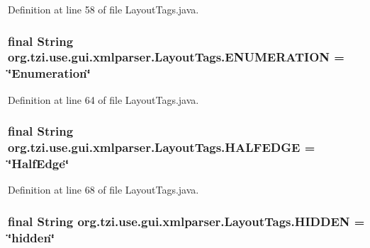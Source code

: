Definition at line 58 of file Layout\-Tags.\-java.

\hypertarget{classorg_1_1tzi_1_1use_1_1gui_1_1xmlparser_1_1_layout_tags_ad4781ead16db01051179e20726745fa1}{
\subsubsection[{E\-N\-U\-M\-E\-R\-A\-T\-I\-O\-N}]{\setlength{\rightskip}{0pt plus 5cm}final String org.\-tzi.\-use.\-gui.\-xmlparser.\-Layout\-Tags.\-E\-N\-U\-M\-E\-R\-A\-T\-I\-O\-N = \char`\"{}Enumeration\char`\"{}\hspace{0.3cm}{\ttfamily [static]}}}\label{classorg_1_1tzi_1_1use_1_1gui_1_1xmlparser_1_1_layout_tags_ad4781ead16db01051179e20726745fa1}


Definition at line 64 of file Layout\-Tags.\-java.

\hypertarget{classorg_1_1tzi_1_1use_1_1gui_1_1xmlparser_1_1_layout_tags_aa2ee4cf5fdb7248e726f25f4db4c02ab}{
\subsubsection[{H\-A\-L\-F\-E\-D\-G\-E}]{\setlength{\rightskip}{0pt plus 5cm}final String org.\-tzi.\-use.\-gui.\-xmlparser.\-Layout\-Tags.\-H\-A\-L\-F\-E\-D\-G\-E = \char`\"{}Half\-Edge\char`\"{}\hspace{0.3cm}{\ttfamily [static]}}}\label{classorg_1_1tzi_1_1use_1_1gui_1_1xmlparser_1_1_layout_tags_aa2ee4cf5fdb7248e726f25f4db4c02ab}


Definition at line 68 of file Layout\-Tags.\-java.

\hypertarget{classorg_1_1tzi_1_1use_1_1gui_1_1xmlparser_1_1_layout_tags_ac43212c066a2dac2904695b0ddcf75fb}{
\subsubsection[{H\-I\-D\-D\-E\-N}]{\setlength{\rightskip}{0pt plus 5cm}final String org.\-tzi.\-use.\-gui.\-xmlparser.\-Layout\-Tags.\-H\-I\-D\-D\-E\-N = \char`\"{}hidden\char`\"{}\hspace{0.3cm}{\ttfamily [static]}}}\label{classorg_1_1tzi_1_1use_1_1gui_1_1xmlparser_1_1_layout_tags_ac43212c066a2dac2904695b0ddcf75fb}



